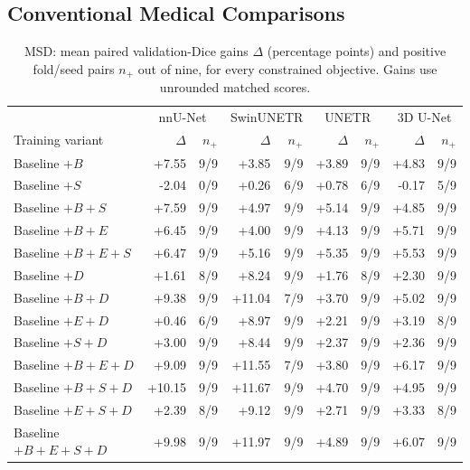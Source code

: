 \documentclass[12pt,a4paper]{article}
\begin{document}
\FloatBarrier
\subsection{Conventional Medical Comparisons}

\begin{table}[htbp]
\centering\small{}
\setlength{\tabcolsep}{4pt}
\renewcommand{\arraystretch}{1.12}
\begin{tabular}{@{}l*{4}{rr}@{}}
\hline
 & \multicolumn{2}{c}{nnU-Net} & \multicolumn{2}{c}{SwinUNETR} & \multicolumn{2}{c}{UNETR} & \multicolumn{2}{c}{3D U-Net} \\
Training variant & $\Delta$ & $n_+$ & $\Delta$ & $n_+$ & $\Delta$ & $n_+$ & $\Delta$ & $n_+$ \\
\hline
Baseline $+B$ & +7.55 & 9/9 & +3.85 & 9/9 & +3.89 & 9/9 & +4.83 & 9/9 \\
Baseline $+S$ & -2.04 & 0/9 & +0.26 & 6/9 & +0.78 & 6/9 & -0.17 & 5/9 \\
Baseline $+B+S$ & +7.59 & 9/9 & +4.97 & 9/9 & +5.14 & 9/9 & +4.85 & 9/9 \\
Baseline $+B+E$ & +6.45 & 9/9 & +4.00 & 9/9 & +4.13 & 9/9 & +5.71 & 9/9 \\
Baseline $+B+E+S$ & +6.47 & 9/9 & +5.16 & 9/9 & +5.35 & 9/9 & +5.53 & 9/9 \\
Baseline $+D$ & +1.61 & 8/9 & +8.24 & 9/9 & +1.76 & 8/9 & +2.30 & 9/9 \\
Baseline $+B+D$ & +9.38 & 9/9 & +11.04 & 7/9 & +3.70 & 9/9 & +5.02 & 9/9 \\
Baseline $+E+D$ & +0.46 & 6/9 & +8.97 & 9/9 & +2.21 & 9/9 & +3.19 & 8/9 \\
Baseline $+S+D$ & +3.00 & 9/9 & +8.44 & 9/9 & +2.37 & 9/9 & +2.36 & 9/9 \\
Baseline $+B+E+D$ & +9.09 & 9/9 & +11.55 & 7/9 & +3.80 & 9/9 & +6.17 & 9/9 \\
Baseline $+B+S+D$ & +10.15 & 9/9 & +11.67 & 9/9 & +4.70 & 9/9 & +4.95 & 9/9 \\
Baseline $+E+S+D$ & +2.39 & 8/9 & +9.12 & 9/9 & +2.71 & 9/9 & +3.33 & 8/9 \\
Baseline $+B+E+S+D$ & +9.98 & 9/9 & +11.97 & 9/9 & +4.89 & 9/9 & +6.07 & 9/9 \\
\hline
\end{tabular}
\caption{MSD: mean paired validation-Dice gains $\Delta$
(percentage points) and positive fold/seed pairs $n_+$ out of nine,
for every constrained objective. Gains use unrounded matched scores.}
\label{tab:msd-noaug-ledger}
\end{table}
\end{document}
